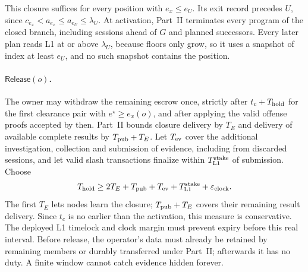 \documentclass[11pt,a4paper]{article}
\newcommand{\tagg}[1]{\mathsf{#1}}
\begin{document}
This closure suffices for every position with $e_x\le e_U$. Its exit
record precedes $U$, since $c_{e_x}<a_{e_x}\le a_{e_U}\le\lambda_U$. At
activation, Part~II terminates every program of the closed branch,
including sessions ahead of $G$ and planned successors. Every later plan
reads L1 at or above $\lambda_U$, because floors only grow, so it uses a
snapshot of index at least $e_U$, and no such snapshot contains the
position.

\paragraph{$\tagg{Release}(o)$.} The owner may withdraw the remaining
escrow once, strictly after $t_c+T_{\rm hold}$ for the first clearance pair
with $e^\star\ge e_x(o)$, and after applying the valid offense proofs
accepted by then. Part~II bounds closure delivery by $T_E$ and delivery of
available complete results by $T_{\rm pub}+T_E$. Let $T_{\rm ev}$ cover the
additional investigation, collection and submission of evidence,
including from discarded sessions, and let valid slash transactions
finalize within $T_{\rm L1}^{\rm stake}$ of submission. Choose
\begin{equation}\label{eq:hold}
 T_{\rm hold}\ge 2T_E+T_{\rm pub}+T_{\rm ev}+T_{\rm L1}^{\rm stake}
 +\varepsilon_{\rm clock}.
\end{equation}
The first $T_E$ lets nodes learn the closure; $T_{\rm pub}+T_E$ covers
their remaining result delivery. Since $t_c$ is no earlier than the
activation, this measure is conservative. The deployed L1 timelock and
clock margin must prevent expiry before this real interval. Before
release, the operator's data must already be retained by remaining
members or durably transferred under Part~II; afterwards it has no duty.
A finite window cannot catch evidence hidden forever.
\end{document}
